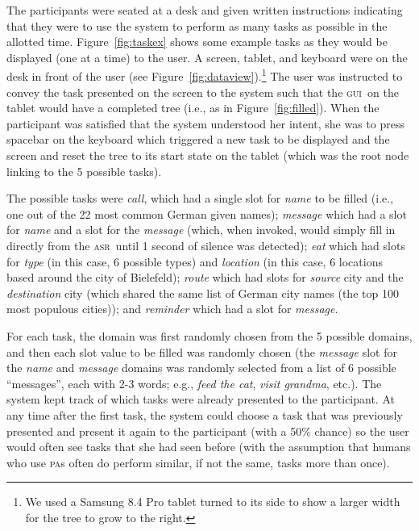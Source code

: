 \documentclass[11pt]{article}
\newcommand{\asr}[0]{\textsc{asr}}
\newcommand{\ui}[0]{\textsc{gui}}
\newcommand{\pa}[0]{\textsc{pa}}
\begin{document}
The participants were seated at a desk and given written instructions indicating that they were to use the system to perform as many tasks as possible in the allotted time. Figure~\ref{fig:taskex} shows some example tasks as they would be displayed (one at a time) to the user. A screen, tablet, and keyboard were on the desk in front of the user (see Figure~\ref{fig:dataview}).\footnote{We used a Samsung 8.4 Pro tablet turned to its side to show a larger width for the tree to grow to the right.} The user was instructed to convey the task presented on the screen to the system such that the \ui\ on the tablet would have a completed tree (i.e., as in Figure~\ref{fig:filled}). When the participant was satisfied that the system understood her intent, she was to press spacebar on the keyboard which triggered a new task to be displayed and the screen and reset the tree to its start state on the tablet (which was the root node linking to the 5 possible tasks). 

The possible tasks were \emph{call}, which had a single slot for \emph{name} to be filled (i.e., one out of the 22 most common German given names); \emph{message} which had a slot for \emph{name} and a slot for the \emph{message} (which, when invoked, would simply fill in directly from the \asr\ until 1 second of silence was detected); \emph{eat} which had slots for \emph{type} (in this case, 6 possible types) and \emph{location} (in this case, 6 locations based around the city of Bielefeld); \emph{route} which had slots for \emph{source} city and the \emph{destination} city (which shared the same list of German city names (the top 100 most populous cities)); and \emph{reminder} which had a slot for \emph{message}. 


For each task, the domain was first randomly chosen from the 5 possible domains, and then each slot value to be filled was randomly chosen (the \emph{message} slot for the \emph{name} and \emph{message} domains was randomly selected from a list of 6 possible ``messages'', each with 2-3 words; e.g., \emph{feed the cat}, \emph{visit grandma}, etc.). The system kept track of which tasks were already presented to the participant. At any time after the first task, the system could choose a task that was previously presented and present it again to the participant (with a 50\% chance) so the user would often see tasks that she had seen before (with the assumption that humans who use \pa s often do perform similar, if not the same, tasks more than once). 
\end{document}
